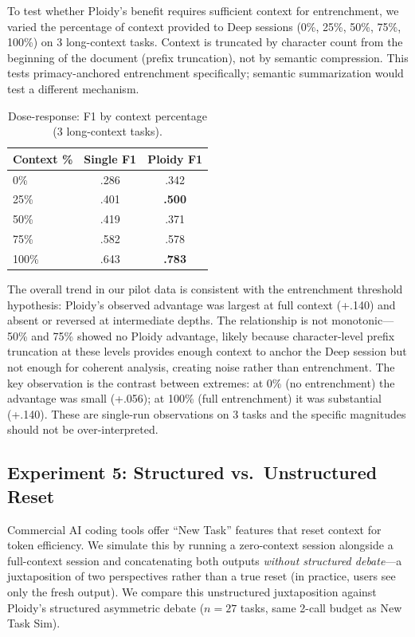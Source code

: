 \documentclass{article}
\begin{document}
To test whether Ploidy's benefit requires sufficient context for entrenchment, we varied the percentage of context provided to Deep sessions (0\%, 25\%, 50\%, 75\%, 100\%) on 3 long-context tasks. Context is truncated by character count from the beginning of the document (prefix truncation), not by semantic compression. This tests primacy-anchored entrenchment specifically; semantic summarization would test a different mechanism.

\begin{table}[t]
\centering
\caption{Dose-response: F1 by context percentage (3 long-context tasks).}
\label{tab:dose-response}
\footnotesize
\begin{tabular}{@{}lcc@{}}
\toprule
\textbf{Context \%} & \textbf{Single F1} & \textbf{Ploidy F1} \\
\midrule
0\% & .286 & .342 \\
25\% & .401 & \textbf{.500} \\
50\% & .419 & .371 \\
75\% & .582 & .578 \\
100\% & .643 & \textbf{.783} \\
\bottomrule
\end{tabular}
\end{table}

The overall trend in our pilot data is consistent with the entrenchment threshold hypothesis: Ploidy's observed advantage was largest at full context (+.140) and absent or reversed at intermediate depths. The relationship is not monotonic---50\% and 75\% showed no Ploidy advantage, likely because character-level prefix truncation at these levels provides enough context to anchor the Deep session but not enough for coherent analysis, creating noise rather than entrenchment. The key observation is the contrast between extremes: at 0\% (no entrenchment) the advantage was small (+.056); at 100\% (full entrenchment) it was substantial (+.140). These are single-run observations on 3 tasks and the specific magnitudes should not be over-interpreted.

\subsection{Experiment 5: Structured vs.\ Unstructured Reset}

Commercial AI coding tools offer ``New Task'' features that reset context for token efficiency. We simulate this by running a zero-context session alongside a full-context session and concatenating both outputs \emph{without structured debate}---a juxtaposition of two perspectives rather than a true reset (in practice, users see only the fresh output). We compare this unstructured juxtaposition against Ploidy's structured asymmetric debate ($n{=}27$ tasks, same 2-call budget as New Task Sim).
\end{document}
